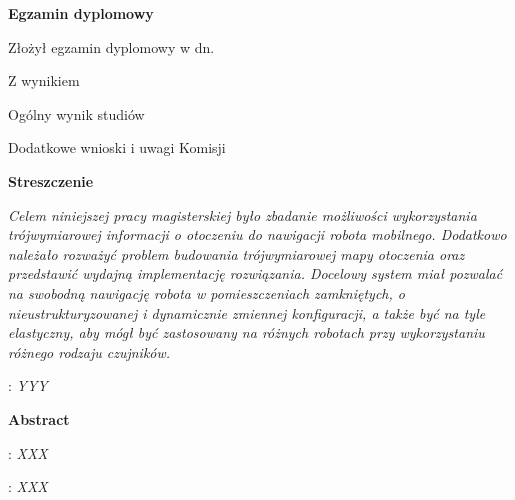 \begin{titlepage}
    \begin{center}
 	{\large\bfseries Egzamin dyplomowy} \par\bigskip\bigskip
    \end{center}
    \par\noindent\vspace{1.5\baselineskip}
    Złożył egzamin dyplomowy w dn. \dotfill
    \par\noindent\vspace{1.5\baselineskip}
    Z wynikiem \dotfill
    \par\noindent\vspace{1.5\baselineskip}
    Ogólny wynik studiów \dotfill
    \par\noindent\vspace{1.5\baselineskip}
    Dodatkowe wnioski i uwagi Komisji \dotfill
    \par\noindent\vspace{1.5\baselineskip}
    \dotfill


	    \cleardoublepage
    \newpage\thispagestyle{empty}
    \begin{center}
	{\large\bfseries Streszczenie}\par\bigskip
    \end{center}

    {\itshape
    Celem niniejszej pracy magisterskiej było zbadanie możliwości wykorzystania
    trójwymiarowej informacji o otoczeniu do nawigacji robota mobilnego. Dodatkowo
    należało rozważyć problem budowania trójwymiarowej mapy otoczenia oraz przedstawić
    wydajną implementację rozwiązania. Docelowy system miał pozwalać na swobodną
    nawigację robota w pomieszczeniach zamkniętych, o nieustrukturyzowanej i
    dynamicznie zmiennej konfiguracji, a także być na tyle elastyczny, aby mógł być
    zastosowany na różnych robotach przy wykorzystaniu różnego rodzaju czujników.

    
    }
    \vspace*{1\baselineskip}

    : {\itshape YYY }
    \par
    \vspace{4\baselineskip}
    \begin{center}
	{\large\bfseries Abstract}\par\bigskip
    \end{center}
    : {\itshape XXX}\par
    \vspace*{1\baselineskip}
    {\itshape

    }
    \vspace*{1\baselineskip}

    : {\itshape XXX}

\end{titlepage}
